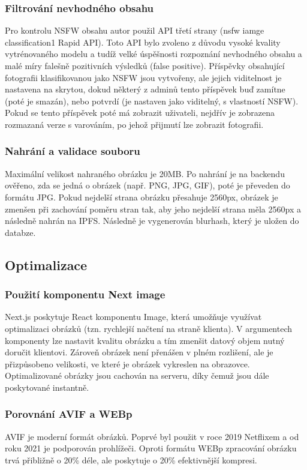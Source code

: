 \documentclass[12pt, a4paper,
 twoside,        %
 openright
]{report}
\begin{document}
\subsubsection{Filtrování nevhodného obsahu}\label{section:nsfw_filter}
Pro kontrolu NSFW obsahu autor použil API třetí strany (nsfw iamge classification1 Rapid API). Toto API bylo zvoleno z důvodu vysoké kvality vytrénovaného modelu a tudíž velké úspěšnosti rozpoznání nevhodného obsahu a malé míry falešně pozitivních výsledků (false positive). Příspěvky obsahující fotografii klasifikovanou jako NSFW jsou vytvořeny, ale jejich viditelnost je nastavena na skrytou, dokud některý z adminů tento příspěvek buď zamítne (poté je smazán), nebo potvrdí (je nastaven jako viditelný, s vlastností NSFW). Pokud se tento příspěvek poté má zobrazit uživateli, nejdřív je zobrazena rozmazaná verze s varováním, po jehož přijmutí lze zobrazit fotografii.

\subsubsection{Nahrání a validace souboru} Maximální velikost nahraného obrázku je 20MB.  Po nahrání je na backendu ověřeno, zda se jedná o obrázek (např. PNG, JPG, GIF), poté je převeden do formátu JPG. Pokud nejdelší strana obrázku přesahuje 2560px, obrázek je zmenšen při zachování poměru stran tak, aby jeho nejdelší strana měla 2560px a následně nahrán na IPFS. Následně je vygenerován blurhash, který je uložen do databze.
\subsection{Optimalizace}
\subsubsection{Použití komponentu Next image}
Next.js poskytuje React komponentu Image, která umožňuje využívat optimalizaci obrázků (tzn. rychlejší načtení na straně klienta). V argumentech komponenty lze nastavit kvalitu obrázku a tím zmenšit datový objem nutný doručit klientovi. Zároveň obrázek není přenášen v plném rozlišení, ale je přizpůsobeno velikosti, ve které je obrázek vykreslen na obrazovce. Optimalizované obrázky jsou cachován na serveru, díky čemuž jsou dále poskytované instantně.
\subsubsection{Porovnání AVIF a WEBp}
AVIF je moderní formát obrázků. Poprvé byl použit v roce 2019 Netflixem a od roku 2021 je podporován prohlížeči. Oproti formátu WEBp zpracování obrázku trvá přibližně o 20\% déle, ale poskytuje o 20\% efektivnější kompresi.
\end{document}
